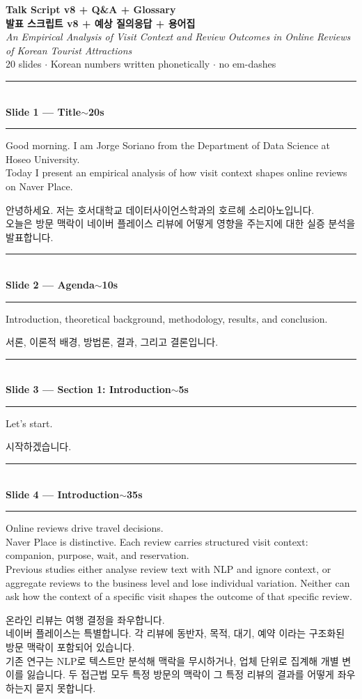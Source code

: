 \documentclass[10pt,a4paper]{article}
\newcommand{\sechead}[2]{%
  \vspace{6pt}%
  \noindent\rule{\linewidth}{0.6pt}\\[1pt]
  {\small\bfseries #1\hfill #2}\\[-3pt]
  \rule{\linewidth}{0.4pt}\par\vspace{2pt}%
}
\newcommand{\sent}[1]{#1\\[4pt]}
\newcommand{\bilingual}[2]{%
  \noindent%
  \begin{minipage}[t]{0.485\linewidth}
    \small #1
  \end{minipage}\hfill\vrule\hfill%
  \begin{minipage}[t]{0.483\linewidth}
    \small #2
  \end{minipage}\par\vspace{3pt}%
}
\begin{document}
\begin{center}
  {\large\bfseries Talk Script v8 + Q\&A + Glossary}\\[3pt]
  {\large\bfseries 발표 스크립트 v8 + 예상 질의응답 + 용어집}\\[2pt]
  {\small \textit{An Empirical Analysis of Visit Context and Review Outcomes
  in Online Reviews of Korean Tourist Attractions}}\\[2pt]
  {\small 20 slides $\cdot$ Korean numbers written phonetically $\cdot$ no em-dashes}
\end{center}

\vspace{4pt}

\sechead{Slide 1 --- Title}{$\sim$20s}

\bilingual{%
\sent{Good morning. I am Jorge Soriano from the Department of Data
Science at Hoseo University.}
\sent{Today I present an empirical analysis of how visit context shapes
online reviews on Naver Place.}
}{%
\sent{안녕하세요. 저는 호서대학교 데이터사이언스학과의 호르헤
소리아노입니다.}
\sent{오늘은 방문 맥락이 네이버 플레이스 리뷰에 어떻게 영향을 주는지에
대한 실증 분석을 발표합니다.}
}

\sechead{Slide 2 --- Agenda}{$\sim$10s}

\bilingual{%
\sent{Introduction, theoretical background, methodology, results, and
conclusion.}
}{%
\sent{서론, 이론적 배경, 방법론, 결과, 그리고 결론입니다.}
}

\sechead{Slide 3 --- Section 1: Introduction}{$\sim$5s}

\bilingual{%
\sent{Let's start.}
}{%
\sent{시작하겠습니다.}
}

\sechead{Slide 4 --- Introduction}{$\sim$35s}

\bilingual{%
\sent{Online reviews drive travel decisions.}
\sent{Naver Place is distinctive. Each review carries structured visit
context: companion, purpose, wait, and reservation.}
\sent{Previous studies either analyse review text with NLP and ignore
context, or aggregate reviews to the business level and lose individual
variation. Neither can ask how the context of a specific visit shapes
the outcome of that specific review.}
}{%
\sent{온라인 리뷰는 여행 결정을 좌우합니다.}
\sent{네이버 플레이스는 특별합니다. 각 리뷰에 동반자, 목적, 대기, 예약
이라는 구조화된 방문 맥락이 포함되어 있습니다.}
\sent{기존 연구는 NLP로 텍스트만 분석해 맥락을 무시하거나, 업체 단위로
집계해 개별 변이를 잃습니다. 두 접근법 모두 특정 방문의 맥락이 그 특정
리뷰의 결과를 어떻게 좌우하는지 묻지 못합니다.}
}
\end{document}
